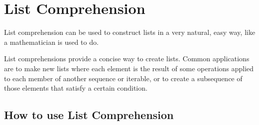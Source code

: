 \documentclass{book}
\begin{document}
\section*{List Comprehension}
List comprehension can be used to construct lists in a very natural, easy way, like a mathematician is used to do.

List comprehensions provide a concise way to create lists. Common applications are to make new lists where each element is the result of some operations applied to each member of another sequence or iterable, or to create a subsequence of those elements that satisfy a certain condition.

\subsection*{How to use List Comprehension}
\end{document}
